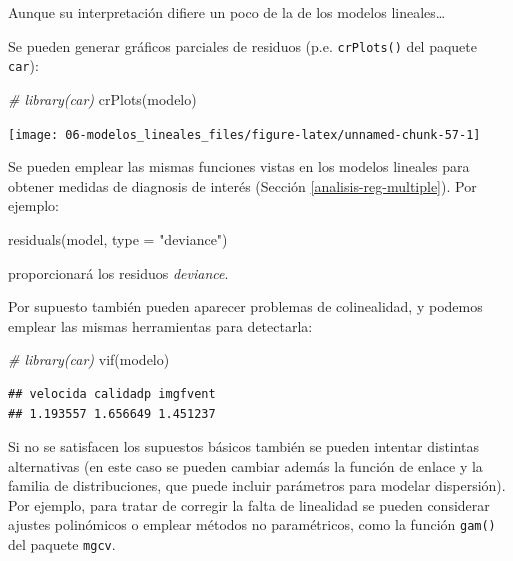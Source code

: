\documentclass[
]{book}
\newenvironment{Shaded}{\begin{snugshade}}{\end{snugshade}}
\newcommand{\AttributeTok}[1]{\textcolor[rgb]{0.77,0.63,0.00}{#1}}
\newcommand{\CommentTok}[1]{\textcolor[rgb]{0.56,0.35,0.01}{\textit{#1}}}
\newcommand{\FunctionTok}[1]{\textcolor[rgb]{0.00,0.00,0.00}{#1}}
\newcommand{\NormalTok}[1]{#1}
\newcommand{\StringTok}[1]{\textcolor[rgb]{0.31,0.60,0.02}{#1}}
\theoremstyle{break}
\theoremstyle{definition}
\theoremstyle{definition}
\theoremstyle{definition}
\theoremstyle{definition}
\theoremstyle{remark}
\begin{document}
Aunque su interpretación difiere un poco de la de los modelos lineales\ldots{}

Se pueden generar gráficos parciales de residuos (p.e. \texttt{crPlots()} del paquete \texttt{car}):

\begin{Shaded}
\begin{Highlighting}[]
\CommentTok{\# library(car)}
\FunctionTok{crPlots}\NormalTok{(modelo)}
\end{Highlighting}
\end{Shaded}

\begin{center}\texttt{[image: 06-modelos\_lineales\_files/figure-latex/unnamed-chunk-57-1]} \end{center}

Se pueden emplear las mismas funciones vistas en los modelos lineales para obtener medidas de diagnosis de interés (Sección \ref{analisis-reg-multiple}). Por ejemplo:

\begin{Shaded}
\begin{Highlighting}[]
\FunctionTok{residuals}\NormalTok{(model, }\AttributeTok{type =} \StringTok{"deviance"}\NormalTok{)}
\end{Highlighting}
\end{Shaded}

proporcionará los residuos \emph{deviance}.

Por supuesto también pueden aparecer problemas de colinealidad, y podemos emplear las mismas herramientas para detectarla:

\begin{Shaded}
\begin{Highlighting}[]
\CommentTok{\# library(car)}
\FunctionTok{vif}\NormalTok{(modelo)}
\end{Highlighting}
\end{Shaded}

\begin{verbatim}
## velocida calidadp imgfvent 
## 1.193557 1.656649 1.451237
\end{verbatim}

Si no se satisfacen los supuestos básicos también se pueden intentar distintas alternativas (en este caso se pueden cambiar además la función de enlace y la familia de distribuciones, que puede incluir parámetros para modelar dispersión).
Por ejemplo, para tratar de corregir la falta de linealidad se pueden considerar ajustes polinómicos o emplear métodos no paramétricos, como la función \texttt{gam()} del paquete \texttt{mgcv}.
\end{document}
